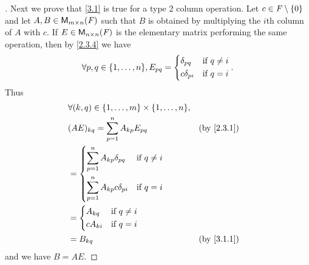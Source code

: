\begin{proof}[]
	Next we prove that \cref{3.1} is true for a type 2 column operation.
	Let \(c \in \mathit{F} \setminus \left\lbrace0\right\rbrace\) and let \(A, B \in \mathsf{M}_{{m} \times n}({\mathit{F}})\) such that \(B\) is obtained by multiplying the \(i\)th column of \(A\) with \(c\).
	If \(E \in \mathsf{M}_{{n} \times n}({\mathit{F}})\) is the elementary matrix performing the same operation, then by \cref{2.3.4} we have
	\[
		\forall p, q \in \set{1, \dots, n}, E_{p q} = \begin{dcases}
			\delta_{p q}   & \text{if } q \neq i \\
			c \delta_{p i} & \text{if } q = i
		\end{dcases}.
	\]
	Thus
	\begin{align*}
		 & \forall (k, q) \in \set{1, \dots, m} \times \set{1, \dots, n},                 \\
		 & (AE)_{k q} = \sum_{p = 1}^n A_{k p} E_{p q}                    &  & \by{2.3.1} \\
		 & = \begin{dcases}
			     \sum_{p = 1}^n A_{k p} \delta_{p q}   & \text{if } q \neq i \\
			     \sum_{p = 1}^n A_{k p} c \delta_{p i} & \text{if } q = i
		     \end{dcases}                  \\
		 & = \begin{dcases}
			     A_{k q}   & \text{if } q \neq i \\
			     c A_{k i} & \text{if } q = i
		     \end{dcases}                                              \\
		 & = B_{k q}                                                      &  & \by{3.1.1}
	\end{align*}
	and we have \(B = AE\).


\end{proof}
